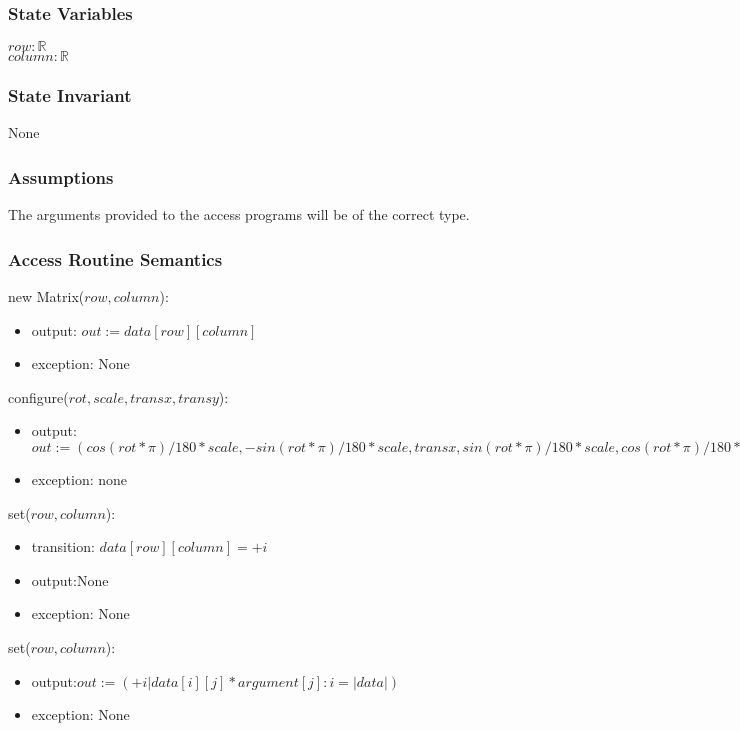 \documentclass[12pt]{article}
\begin{document}
\subsubsection* {State Variables}

$row: \mathbb{R}$\\
$column: \mathbb{R}$\\


\subsubsection* {State Invariant}
None

\subsubsection* {Assumptions}

The arguments provided to the access programs will be of the correct type.

\subsubsection* {Access Routine Semantics}

\noindent new Matrix($row, column$):
\begin{itemize}
\item output: $out := data[row][column]$
\item exception: None
\end{itemize}

\noindent configure($rot, scale, transx, transy$):
\begin{itemize}
\item output: $out := (cos(rot * \pi)/180 *scale ,-sin(rot * \pi)/180 *scale,transx ,sin(rot * \pi)/180 *scale,cos(rot * \pi)/180 *scale,transy )$
\item exception: none
\end{itemize}

\noindent set($row, column$):
\begin{itemize}
\item transition: $data[row][column] = +i$
\item output:None
\item exception: None
\end{itemize}

\noindent set($row, column$):
\begin{itemize}
\item output:$out := (+i| data[i][j] * argument[j]: i = |data|)$
\item exception: None
\end{itemize}
\end{document}
